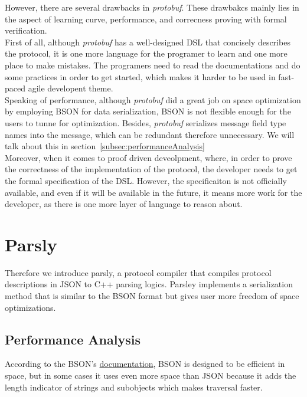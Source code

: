 \documentclass{article}
\begin{document}
However, there are several drawbacks in \textit{protobuf}. These drawbakcs mainly lies in the aspect of learning curve, performance, and correcness proving with formal verification.\\

First of all, although \textit{protobuf} has a well-designed DSL that concisely describes the protocol, it is one more language for the programer to learn and one more place to make mistakes. The programers need to read the documentations and do some practices in order to get started, which makes it harder to be used in fast-paced agile developent theme.\\

Speaking of performance, although \textit{protobuf} did a great job on space optimization by employing BSON for data serialization, BSON is not flexible enough for the users to tunne for optimization. Besides, \textit{protobuf} serializes message field type names into the message, which can be redundant therefore unnecessary. We will talk about this in section~\ref{subsec:performanceAnalysis} \\

Moreover, when it comes to proof driven deveolpment, where, in order to prove the correctness of the implementation of the protocol, the developer needs to get the formal specification of the DSL. However, the specificaiton is not officially available, and even if it will be available in the future, it means more work for the developer, as there is one more layer of language to reason about. \\


\section{Parsly}
Therefore we introduce parsly, a protocol compiler that compiles protocol descriptions in JSON to C++ parsing logics. Parsley implements a serialization method that is similar to the BSON format but gives user more freedom of space optimizations. \\

\label{subsec:performanceAnalysis}
\subsection{Performance Analysis}
According to the BSON's \href{http://bsonspec.org}{documentation}, BSON is designed to be efficient in space, but in some cases it uses even more space than JSON because it adds the length indicator of strings and subobjects which makes traversal faster.\\
\end{document}
